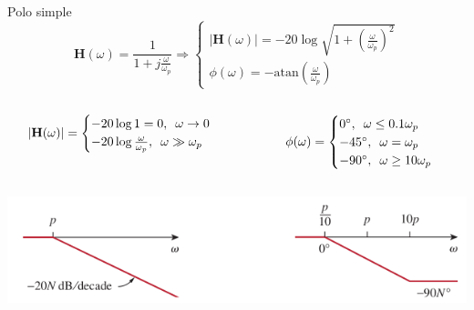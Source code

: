 \documentclass[aspectratio=169, usenames,svgnames,dvipsnames]{beamer}
\newcommand{\fasor}[1]{\mathbf{#1}(\omega)}
\newcommand{\atan}{\mathrm{atan}}
\begin{document}
\begin{frame}[label={sec:org00d00ef}]{Polo simple}
\[
  \fasor{H} = \frac{1}{1 + j\frac{\omega}{\omega_p}} \Rightarrow
  \begin{cases}
    |\fasor{H}| =  - 20 \log \sqrt{1 + \left(\frac{\omega}{\omega_p}\right)^2}\\
    \phi(\omega) = - \atan(\frac{\omega}{\omega_p}) 
  \end{cases}
\]

\begin{columns}
\begin{column}{0.5\columnwidth}
\[
  |\fasor{H}| = 
  \begin{cases}
  - 20 \log 1 = 0, \enskip \omega \to 0\\
  - 20 \log \frac{\omega}{\omega_p}, \enskip \omega \gg \omega_p\\
  \end{cases}
\]
\end{column}

\begin{column}{0.5\columnwidth}
\[
  \phi(\omega) = 
  \begin{cases}
    \ang{0},\enskip \omega \leq 0.1\omega_p\\
    - \ang{45}, \enskip \omega = \omega_p\\
    - \ang{90}, \enskip \omega \geq 10 \omega_p
  \end{cases}
\]
\end{column}
\end{columns}

\begin{center}
\includegraphics[width=.9\linewidth]{../figs/BodePoloSimple.pdf}
\end{center}
\end{frame}
\end{document}
